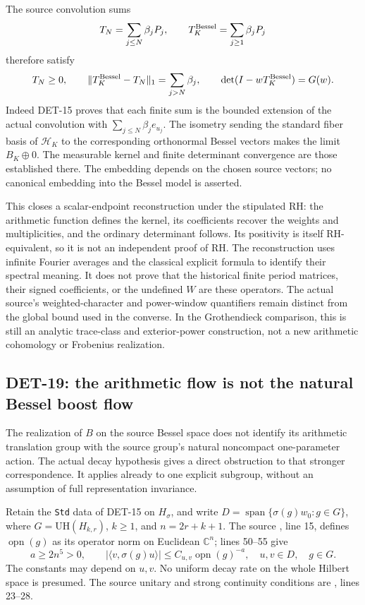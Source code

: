 \documentclass[11pt,a4paper]{article}
\newcommand{\C}{\mathbb C}
\newcommand{\fid}[1]{\textsf{#1}}
\begin{document}
The source convolution sums
\[
 T_N=\sum_{j\le N}\beta_jP_j,\qquad
 T_K^{\rm Bessel}=\sum_{j\ge1}\beta_jP_j
\]
therefore satisfy
\[
 T_N\ge0,\qquad
 \|T_K^{\rm Bessel}-T_N\|_1=\sum_{j>N}\beta_j,\qquad
 \det(I-wT_K^{\rm Bessel})=G(w).
\]
Indeed \fid{DET-15} proves that each finite sum is the bounded
extension of the actual convolution with
\(\sum_{j\le N}\beta_je_{u_j}\). The isometry sending the standard
fiber basis of \(\mathcal H_K\) to the corresponding orthonormal
Bessel vectors makes the limit \(B_K\oplus0\).
The measurable kernel and finite determinant convergence are
those established there. The embedding depends on the chosen
source vectors; no canonical embedding into the Bessel model
is asserted.

This closes a scalar-endpoint reconstruction under the stipulated RH:
the arithmetic function defines the kernel, its coefficients recover
the weights and multiplicities, and the ordinary determinant follows.
Its positivity is itself RH-equivalent, so it is not an independent
proof of RH. The reconstruction uses infinite Fourier averages and
the classical explicit formula to identify their spectral meaning.
It does not prove that the historical finite period matrices,
their signed coefficients, or the undefined \(W\) are these operators.
The actual source's weighted-character and power-window quantifiers
remain distinct from the global bound used in the converse.
In the Grothendieck comparison, this is still an analytic
trace-class and exterior-power construction, not a new arithmetic
cohomology or Frobenius realization.

\subsection{DET-19: the arithmetic flow is not the natural Bessel boost flow}
The realization of \(B\) on the source Bessel space does not identify
its arithmetic translation group with the source group's natural
noncompact one-parameter action. The actual decay hypothesis gives
a direct obstruction to that stronger correspondence. It applies
already to one explicit subgroup, without an assumption of full
representation invariance.

Retain the \texttt{Std} data of \fid{DET-15} on \(H_\sigma\), and
write \(D=\operatorname{span}\{\sigma(g)w_0:g\in G\}\), where
\(G=\mathrm{UH}(H_{k,r})\), \(k\ge1\), and \(n=2r+k+1\).
The source
,
line 15, defines \(\operatorname{opn}(g)\) as its operator norm on
Euclidean \(\C^n\); lines 50--55 give
\begin{equation}\label{eq:boost-source-decay}
 a\ge2n^5>0,\qquad
 |\langle v,\sigma(g)u\rangle|
 \le C_{u,v}\operatorname{opn}(g)^{-a},
 \quad u,v\in D,\quad g\in G.
\end{equation}
The constants may depend on \(u,v\). No uniform decay rate on
the whole Hilbert space is presumed. The source unitary and strong
continuity conditions are
,
lines 23--28.
\end{document}
